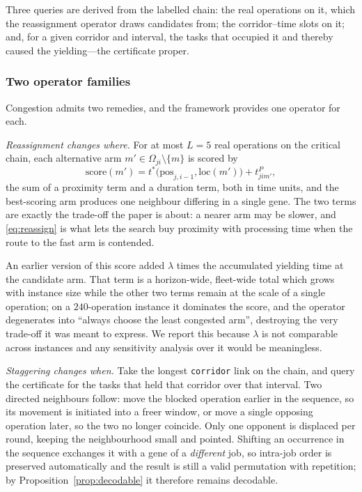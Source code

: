 \documentclass[manuscript,screen,review]{acmart}
\begin{document}
Three queries are derived from the labelled chain: the real operations on it,
which the reassignment operator draws candidates from; the corridor--time slots
on it; and, for a given corridor and interval, the tasks that occupied it and
thereby caused the yielding---the certificate proper.

\subsubsection{Two operator families}
Congestion admits two remedies, and the framework provides one operator for
each.

\emph{Reassignment changes where.} For at most $L=5$ real operations on the
critical chain, each alternative arm $m'\in\Omega_{ji}\setminus\{m\}$ is scored
by
\begin{equation}
\label{eq:reassign}
\mathrm{score}(m')=t^{*}\bigl(\mathrm{pos}_{j,i-1},\mathrm{loc}(m')\bigr)
+t^{P}_{jim'},
\end{equation}
the sum of a proximity term and a duration term, both in time units, and the
best-scoring arm produces one neighbour differing in a single gene. The two
terms are exactly the trade-off the paper is about: a nearer arm may be slower,
and \eqref{eq:reassign} is what lets the search buy proximity with processing
time when the route to the fast arm is contended.

An earlier version of this score added $\lambda$ times the accumulated yielding
time at the candidate arm. That term is a horizon-wide, fleet-wide total which
grows with instance size while the other two terms remain at the scale of a
single operation; on a $240$-operation instance it dominates the score, and the
operator degenerates into ``always choose the least congested arm'', destroying
the very trade-off it was meant to express. We report this because $\lambda$ is
not comparable across instances and any sensitivity analysis over it would be
meaningless.

\emph{Staggering changes when.} Take the longest \texttt{corridor} link on the
chain, and query the certificate for the tasks that held that corridor over
that interval. Two directed neighbours follow: move the blocked operation
earlier in the sequence, so its movement is initiated into a freer window, or
move a single opposing operation later, so the two no longer coincide. Only one
opponent is displaced per round, keeping the neighbourhood small and pointed.
Shifting an occurrence in the sequence exchanges it with a gene of a
\emph{different} job, so intra-job order is preserved automatically and the
result is still a valid permutation with repetition; by
Proposition~\ref{prop:decodable} it therefore remains decodable.
\end{document}
